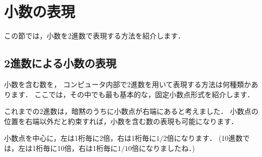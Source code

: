 \section{小数の表現}

この節では，小数を2進数で表現する方法を紹介します．

\subsection{2進数による小数の表現}

小数を含む数を，
コンピュータ内部で2進数を用いて表現する方法は何種類かあります．
ここでは，その中でも最も基本的な，固定小数点形式を紹介します．

これまでの2進数は，暗黙のうちに小数点が右端にあると考えました．
小数点の位置を右端以外だと約束すれば，小数を含む数の表現も可能になります．

\vspace{0.2cm}
\vspace{0.2cm}

小数点を中心に，左は1桁毎に2倍，右は1桁毎に$1/2$倍になります．
(10進数では，左は1桁毎に10倍，右は1桁毎に$1/10$倍になりましたね．)

